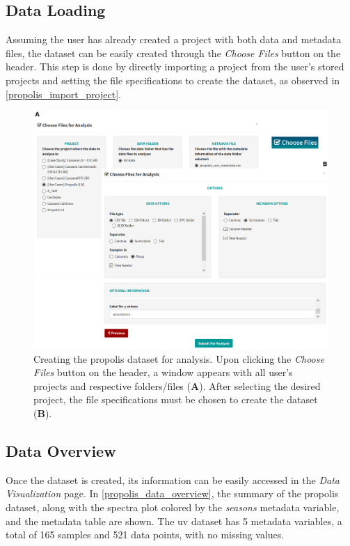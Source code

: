 \subsection{Data Loading} \label{propolis_loading}

Assuming the user has already created a project with both data and metadata files, the dataset can be easily created through the \textit{Choose Files} button on the header. This step is done by directly importing a project from the user's stored projects and setting the file specifications to create the dataset, as observed in \autoref{propolis_import_project}.

\begin{figure}[h]
	\centering
	\includegraphics[width=1\linewidth]{Imagens/Propolis/import_project}
	\caption{Creating the propolis dataset for analysis. Upon clicking the \textit{Choose Files} button on the header, a window appears with all user's projects and respective folders/files (\textbf{A}). After selecting the desired project, the file specifications must be chosen to create the dataset (\textbf{B}).}
	\label{propolis_import_project}
\end{figure}


\subsection{Data Overview}

Once the dataset is created, its information can be easily accessed in the \textit{Data Visualization} page. 
In \autoref{propolis_data_overview}, the summary of the propolis dataset, along with the spectra plot colored by the \textit{seasons} metadata variable, and the metadata table are shown. The \gls{uv} dataset has 5 metadata variables, a total of 165 samples and 521 data points, with no missing values.


